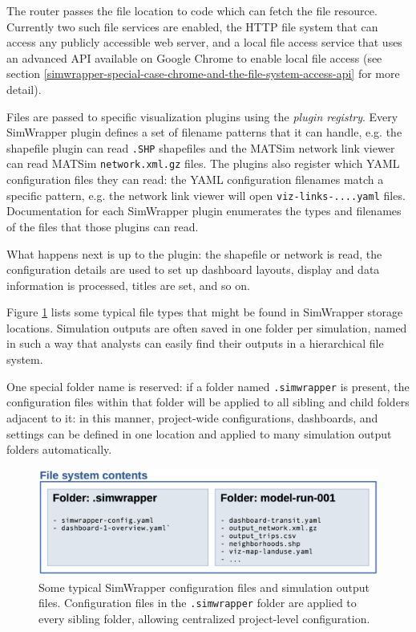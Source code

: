 The router passes the file location to code which can fetch the file resource. Currently two such file services are enabled, the HTTP file system that can access any publicly accessible web server, and a local file access service that uses an advanced API available on Google Chrome to enable local file access (see section \ref{simwrapper-special-case-chrome-and-the-file-system-access-api} for more detail).

Files are passed to specific visualization plugins using the \emph{plugin registry}. Every SimWrapper plugin defines a set of filename patterns that it can handle, e.g. the shapefile plugin can read \texttt{.SHP} shapefiles and the MATSim network link viewer can read MATSim \texttt{network.xml.gz} files. The plugins also register which YAML configuration files they can read: the YAML configuration filenames match a specific pattern, e.g. the network link viewer will open \texttt{viz-links-....yaml} files. Documentation for each SimWrapper plugin enumerates the types and filenames of the files that those plugins can read.

What happens next is up to the plugin: the shapefile or network is read, the configuration details are used to set up dashboard layouts, display and data information is processed, titles are set, and so on.

Figure \ref{fig:simwrapper-flowchart-2} lists some typical file types that might be found in SimWrapper storage locations. Simulation outputs are often saved in one folder per simulation, named in such a way that analysts can easily find their outputs in a hierarchical file system.

One special folder name is reserved: if a folder named \texttt{.simwrapper} is present, the configuration files within that folder will be applied to all sibling and child folders adjacent to it: in this manner, project-wide configurations, dashboards, and settings can be defined in one location and applied to many simulation output folders automatically.

\begin{figure}[ht]
  \centering
  \includegraphics[width=0.95\linewidth]{chapters/31-simwrapper/images/flowchart-2.png}
  \caption{Some typical SimWrapper configuration files and simulation output files. Configuration files in the \texttt{.simwrapper} folder are applied to every sibling folder, allowing centralized project-level configuration.}
  \label{fig:simwrapper-flowchart-2}
\end{figure}


